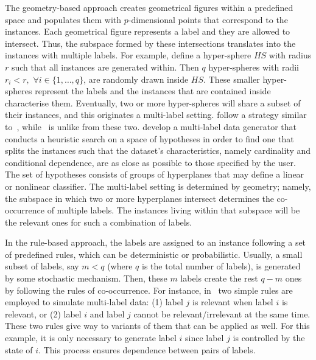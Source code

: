 \documentclass[review]{elsarticle}
\begin{document}
	The geometry-based approach creates geometrical figures within a predefined space and populates them with $p$-dimensional points that correspond to the instances. Each geometrical figure represents a label and they are allowed to intersect. Thus, the subspace formed by these intersections translates into the instances with multiple labels. For example, \citet{EG4} define a hyper-sphere $HS$ with radius $r$ such that all instances are generated within. Then $q$ hyper-spheres with radii $r_{i} < r,$ $\forall i \in \{1,\ldots,q\}$, are randomly drawn inside $HS$. These smaller hyper-spheres represent the labels and the instances that are contained inside characterise them. Eventually, two or more hyper-spheres will share a subset of their instances, and this originates a multi-label setting.
	\citet{MLG2} follow a strategy similar to~\citep{EG4}, while~\citet{MLG1} is unlike from these two. \citet{MLG1} develop a multi-label data generator that conducts a heuristic search on a space of hypotheses in order to find one that splits the instances such that the dataset's characteristics, namely cardinality and conditional dependence, are as close as possible to those specified by the user. The set of hypotheses consists of groups of hyperplanes that may define a linear or nonlinear classifier. The multi-label setting is determined by geometry; namely, the subspace in which two or more hyperplanes intersect determines the co-occurrence of multiple labels. The instances living within that subspace will be the relevant ones for such a combination of labels.
	
	In the rule-based approach, the labels are assigned to an instance following a set of predefined rules, which can be deterministic or probabilistic. Usually, a small subset of labels, say $m < q$ (where $q$ is the total number of labels), is generated by some stochastic mechanism. Then, these $m$ labels create the rest $q-m$ ones by following the rules of co-occurrence. For instance, in~\cite{EG3} two simple rules are employed to simulate multi-label data: (1) label $j$ is relevant when label $i$ is relevant, or (2) label $i$ and label $j$ cannot be relevant/irrelevant at the same time. These two rules give way to variants of them that can be applied as well. For this example, it is only necessary to generate label $i$ since label $j$ is controlled by the state of $i$. This process ensures dependence between pairs of labels.
	
\end{document}
